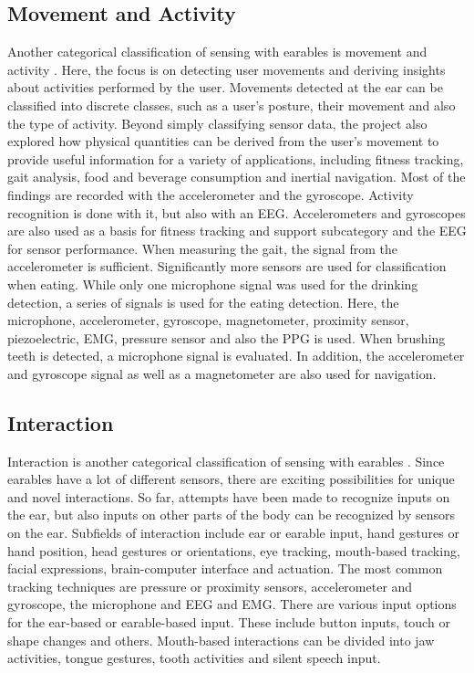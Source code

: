 \subsection{Movement and Activity}
\label{Background:SensingWithEarables:Movement}
Another categorical classification of sensing with earables is movement and activity \cite{roddigerSensingEarablesSystematic2022a}.
Here, the focus is on detecting user movements and deriving insights about activities performed by the user. 
Movements detected at the ear can be classified into discrete classes, such as a user's posture, their movement and also the type of activity. 
Beyond simply classifying sensor data, the project also explored how physical quantities can be derived from the user's movement to provide useful information for a variety of applications, including fitness tracking, gait analysis,
food and beverage consumption and inertial navigation.
Most of the findings are recorded with the accelerometer and the gyroscope.
Activity recognition is done with it, but also with an EEG. Accelerometers and gyroscopes are also used as a basis for fitness tracking and support subcategory and the EEG for sensor performance.
When measuring the gait, the signal from the accelerometer is sufficient.
Significantly more sensors are used for classification when eating. While only one microphone signal was used for the drinking detection, a series of signals is used for the eating detection. 
Here, the microphone, accelerometer, gyroscope, magnetometer, proximity sensor, piezoelectric, EMG, pressure sensor and also the PPG is used.
When brushing teeth is detected, a microphone signal is evaluated.
In addition, the accelerometer and gyroscope signal as well as a magnetometer are also used for navigation.

\subsection{Interaction}
\label{Background:SensingWithEarables:Interaction}
Interaction is another categorical classification of sensing with earables \cite{roddigerSensingEarablesSystematic2022a}.
Since earables have a lot of different sensors, there are exciting possibilities for unique and novel interactions.
So far, attempts have been made to recognize inputs on the ear, but also inputs on other parts of the body can be recognized by sensors on the ear.
Subfields of interaction include ear or earable input, hand gestures or hand position, head gestures or orientations, eye tracking, mouth-based tracking, facial expressions, brain-computer interface and actuation.
The most common tracking techniques are pressure or proximity sensors, accelerometer and gyroscope, the microphone and EEG and EMG.
There are various input options for the ear-based or earable-based input. 
These include button inputs, touch or shape changes and others.
Mouth-based interactions can be divided into jaw activities, tongue gestures, tooth activities and silent speech input.

